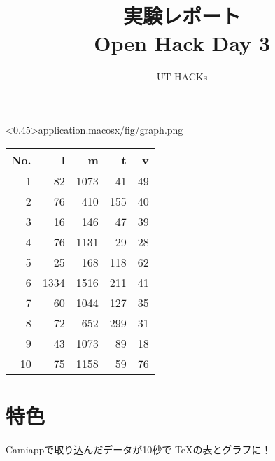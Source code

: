 \documentclass[a4j,12pt,twoside]{tetsujsarticle}
\begin{document}
\title{実験レポート\\Open Hack Day 3}
\author{UT-HACKs}
\maketitle\begin{center}
\img<0.45>{application.macosx/fig/graph.png}\\
\begin{tabular}{rrrrr}\toprule 
No.&l&m&t&v\\
\midrule
1&82&1073&41&49\\
2&76&410&155&40\\
3&16&146&47&39\\
4&76&1131&29&28\\
5&25&168&118&62\\
6&1334&1516&211&41\\
7&60&1044&127&35\\
8&72&652&299&31\\
9&43&1073&89&18\\
10&75&1158&59&76\\
\bottomrule
\end{tabular}
\end{center}
\section{特色}
 Camiappで取り込んだデータが10秒で \TeX の表とグラフに！
\end{document}
